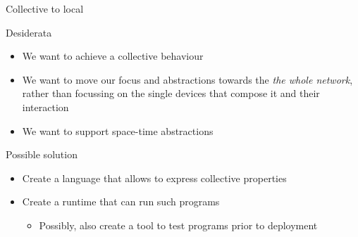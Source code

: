 \documentclass[presentation]{beamer}\mode<presentation>{\usetheme{sapere}}
\begin{document}
\begin{frame}{Collective to local}
  \begin{block}{Desiderata}
    \begin{itemize}
      \item We want to achieve a collective behaviour
      \item We want to move our focus and abstractions towards the \emph{the whole network}, rather than focussing on the single devices that compose it and their interaction
      \item We want to support space-time abstractions
    \end{itemize}
  \end{block}
  \begin{block}{Possible solution}
    \begin{itemize}
      \item Create a language that allows to express collective properties
      \item Create a runtime that can run such programs
      \begin{itemize}
         \item Possibly, also create a tool to test programs prior to deployment
      \end{itemize}
    \end{itemize}
  \end{block}
\end{frame}
\end{document}
